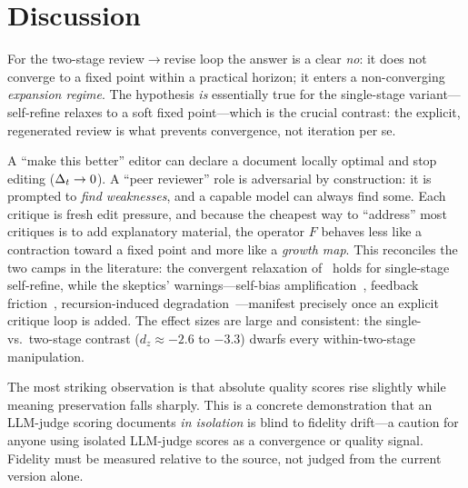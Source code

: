 \section{Discussion}
\label{sec:discussion}

 For the two-stage review$\to$revise loop the answer is a
clear \emph{no}: it does not converge to a fixed point within a practical horizon; it enters a
non-converging \emph{expansion regime}. The hypothesis \emph{is} essentially true for the
single-stage variant---self-refine relaxes to a soft fixed point---which is the crucial
contrast: the explicit, regenerated review is what prevents convergence, not iteration
per se.

 A ``make this better'' editor can declare a document
locally optimal and stop editing ($\Delta_t\to 0$). A ``peer reviewer'' role is adversarial by
construction: it is prompted to \emph{find weaknesses}, and a capable model can always find
some. Each critique is fresh edit pressure, and because the cheapest way to ``address'' most
critiques is to add explanatory material, the operator $F$ behaves less like a contraction
toward a fixed point and more like a \emph{growth map}. This reconciles the two camps in the
literature: the convergent relaxation of~\citet{wu2026converge} holds for single-stage
self-refine, while the skeptics' warnings---self-bias amplification~\citep{xu2024pride},
feedback friction~\citep{feedbackfriction2025}, recursion-induced
degradation~\citep{shumailov2023curse}---manifest precisely once an explicit critique loop is
added. The effect sizes are large and consistent: the single- vs.\ two-stage contrast
($d_z\approx-2.6$ to $-3.3$) dwarfs every within-two-stage manipulation.

 The most striking observation is that absolute
quality scores rise slightly while meaning preservation falls sharply. This is a concrete
demonstration that an LLM-judge scoring documents \emph{in isolation} is blind to fidelity
drift---a caution for anyone using isolated LLM-judge scores as a convergence or quality
signal. Fidelity must be measured relative to the source, not judged from the current version
alone.

